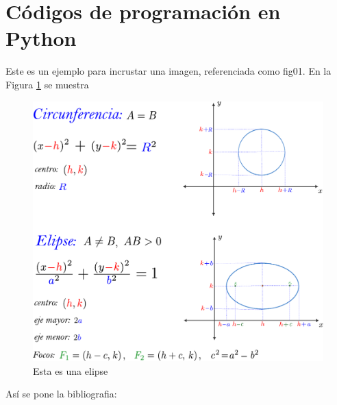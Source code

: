 \documentclass[12pt,letterpaper]{article}
\begin{document}
\section{Códigos de programación en Python}
Este es un ejemplo para incrustar una imagen, referenciada como fig01. En la Figura \ref{fig01} se muestra
\begin{figure}[H]
    \centering
    \includegraphics[scale=0.5]{images/elipse.pdf}
    \caption{Esta es una elipse}
    \label{fig01}
\end{figure}

Así se pone la bibliografia:


\end{document}
